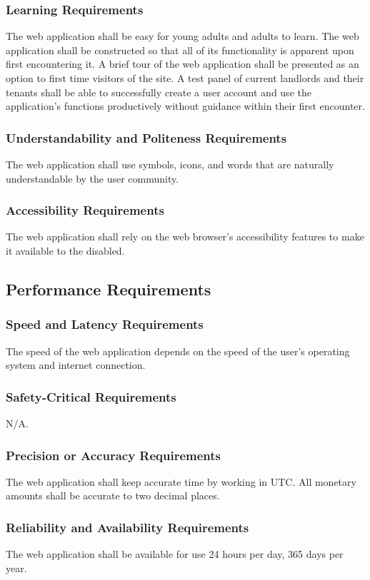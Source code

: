 \documentclass[12pt, titlepage]{article}
\begin{document}
{\subsubsection{Learning Requirements}
The web application shall be easy for young adults and adults to learn. The web application shall be constructed so that all of its functionality is apparent upon first encountering it. A brief tour of the web application shall be presented as an option to first time visitors of the site. A test panel of current landlords and their tenants shall be able to successfully create a user account and use the application's functions productively without guidance within their first encounter.
\subsubsection{Understandability and Politeness Requirements}
The web application shall use symbols, icons, and words that are naturally understandable by the user community. 
\subsubsection{Accessibility Requirements}
The web application shall rely on the web browser's accessibility features to make it available to the disabled.
\subsection{Performance Requirements}
\subsubsection{Speed and Latency Requirements}
The speed of the web application depends on the speed of the user's operating system and internet connection.
\subsubsection{Safety-Critical Requirements}
N/A.
\subsubsection{Precision or Accuracy Requirements}
The web application shall keep accurate time by working in UTC. All monetary amounts shall be accurate to two decimal places. 
\subsubsection{Reliability and Availability Requirements}
The web application shall be available for use 24 hours per day, 365 days per year.
}
\end{document}
